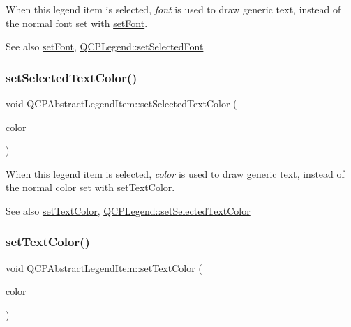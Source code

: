 When this legend item is selected, {\itshape font} is used to draw generic text, instead of the normal font set with \hyperlink{classQCPAbstractLegendItem_a409c53455d8112f71d70c0c43eb10265}{set\+Font}.

\begin{DoxySeeAlso}{See also}
\hyperlink{classQCPAbstractLegendItem_a409c53455d8112f71d70c0c43eb10265}{set\+Font}, \hyperlink{classQCPLegend_ab580a01c3c0a239374ed66c29edf5ad2}{Q\+C\+P\+Legend\+::set\+Selected\+Font} 
\end{DoxySeeAlso}
\mbox{\label{classQCPAbstractLegendItem_a4d01d008ee1a5bfe9905b0397a421936}} 
\subsubsection{\texorpdfstring{set\+Selected\+Text\+Color()}{setSelectedTextColor()}}
{\footnotesize\ttfamily void Q\+C\+P\+Abstract\+Legend\+Item\+::set\+Selected\+Text\+Color (\begin{DoxyParamCaption}\item[{const Q\+Color \&}]{color }\end{DoxyParamCaption})}

When this legend item is selected, {\itshape color} is used to draw generic text, instead of the normal color set with \hyperlink{classQCPAbstractLegendItem_a6ebace6aaffaedcdab2d74e88acc2d1e}{set\+Text\+Color}.

\begin{DoxySeeAlso}{See also}
\hyperlink{classQCPAbstractLegendItem_a6ebace6aaffaedcdab2d74e88acc2d1e}{set\+Text\+Color}, \hyperlink{classQCPLegend_a7674dfc7a1f30e1abd1018c0ed45e0bc}{Q\+C\+P\+Legend\+::set\+Selected\+Text\+Color} 
\end{DoxySeeAlso}
\mbox{\label{classQCPAbstractLegendItem_a6ebace6aaffaedcdab2d74e88acc2d1e}} 
\subsubsection{\texorpdfstring{set\+Text\+Color()}{setTextColor()}}
{\footnotesize\ttfamily void Q\+C\+P\+Abstract\+Legend\+Item\+::set\+Text\+Color (\begin{DoxyParamCaption}\item[{const Q\+Color \&}]{color }\end{DoxyParamCaption})}

